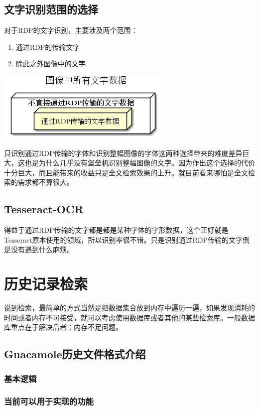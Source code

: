 \documentclass[fontset=windows,11pt]{ctexart}
\begin{document}
\subsection{文字识别范围的选择}
\label{sec-2-1}
对于RDP的文字识别，主要涉及两个范围：
\begin{enumerate}
\item 通过RDP的传输文字
\item 除此之外图像中的文字
\end{enumerate}

\includegraphics[width=.9\linewidth]{文字识别探索/cover.png}



只识别通过RDP传输的字体和识别整幅图像的字体这两种选择带来的难度差异巨大，这也是为什么几乎没有堡垒机识别整幅图像的文字。因为作出这个选择的代价十分巨大，而且能带来的收益只是全文检索效果的上升。就目前看来哪怕是全文检索的需求都不算很大。
\subsection{Tesseract-OCR}
\label{sec-2-2}
得益于通过RDP传输的文字都是都是某种字体的字形数据，这个正好就是Tesseract原本使用的领域，所以识别率很不错。只是识别通过RDP传输的文字倒是没有遇到什么麻烦。   
\section{历史记录检索}
\label{sec-3}
说到检索，最简单的方式当然是把数据集合放到内存中遍历一遍，如果发现消耗的时间或者内存不可接受，就可以考虑使用数据库或者其他的某些检索库。一般数据库重点在于解决后者：内存不足问题。
\subsection{Guacamole历史文件格式介绍}
\label{sec-3-1}
\subsubsection{基本逻辑}
\label{sec-3-1-1}

\subsubsection{当前可以用于实现的功能}
\label{sec-3-1-2}
\end{document}
